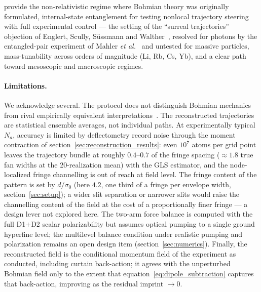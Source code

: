 \documentclass[11pt,a4paper]{article}
\begin{document}
provide the non-relativistic regime where Bohmian theory was originally formulated, internal-state entanglement for testing nonlocal trajectory steering with full experimental control --- the setting of the ``surreal trajectories'' objection of Englert, Scully, S\"ussmann and Walther~\cite{ESSW1992}, resolved for photons by the entangled-pair experiment of Mahler \emph{et al.}~\cite{Mahler2016} and untested for massive particles, mass-tunability across orders of magnitude (Li, Rb, Cs, Yb), and a clear path toward mesoscopic and macroscopic regimes.

\paragraph{Limitations.} We acknowledge several. The protocol does not distinguish Bohmian mechanics from rival empirically equivalent interpretations~\cite{FankhauserDurr2021, Sokolovski2016}. The reconstructed trajectories are statistical ensemble averages, not individual paths. At experimentally typical $N_a$, accuracy is limited by deflectometry record noise through the moment contraction of section~\ref{sec:reconstruction_results}: even $10^7$ atoms per grid point leaves the trajectory bundle at roughly $0.4$--$0.7$ of the fringe spacing ($\approx 1.8$ true fan widths at the 20-realization mean) with the GLS estimator, and the node-localized fringe channelling is out of reach at field level. The fringe content of the pattern is set by $d/\sigma_0$ (here $4.2$, one third of a fringe per envelope width, section~\ref{sec:setup}); a wider slit separation or narrower slits would raise the channelling content of the field at the cost of a proportionally finer fringe --- a design lever not explored here. The two-arm force balance is computed with the full D1$+$D2 scalar polarizability but assumes optical pumping to a single ground hyperfine level; the multilevel balance condition under realistic pumping and polarization remains an open design item (section~\ref{sec:numerics}). Finally, the reconstructed field is the conditional momentum field of the experiment as conducted, including curtain back-action; it agrees with the unperturbed Bohmian field only to the extent that equation~\eqref{eq:dipole_subtraction} captures that back-action, improving as the residual imprint $\to 0$.
\end{document}
